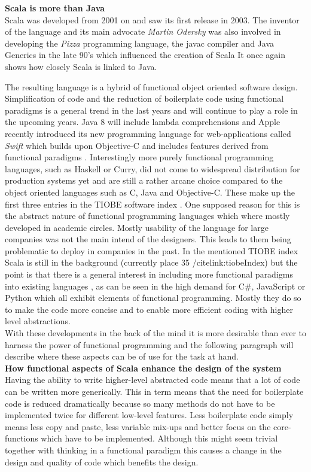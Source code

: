 \documentclass[twoside, 11pt]{scrartcl}
\begin{document}
\textbf{Scala is more than Java}\\
Scala was developed from 2001 on and saw its first release in 2003. The inventor of the language and its main advocate \textit{Martin Odersky} was also involved in developing the \textit{Pizza} programming language, the javac compiler and Java Generics in the late 90's which influenced the creation of Scala \cite{link:scalaHistory} It once again shows how closely Scala is linked to Java.

The resulting language is a hybrid of functional object oriented software design. Simplification of code and the reduction of boilerplate code using functional paradigms is a general trend in the last years and will continue to play a role in the upcoming years. Java 8 will include lambda comprehensions and Apple recently introduced its new programming language for web-applications called \textit{Swift} which builds upon Objective-C and includes features derived from functional paradigms \cite{link:swift}. 
Interestingly more purely functional programming languages, such as Haskell or Curry, did not come to widespread distribution for production systems yet and are still a rather arcane choice compared to the object oriented languages such as C, Java and Objective-C. These make up the first three entries in the TIOBE software index \cite{link:tiobeIndex}. One supposed reason for this is the abstract nature of functional programming languages which where mostly developed in academic circles. Mostly usability of the language for large companies was not the main intend of the designers. This leads to them being problematic to deploy in companies in the past.
In the mentioned TIOBE index Scala is still in the background (currently place 35 /cite{link:tiobeIndex}) but the point is that there is a general interest in including more functional paradigms into existing languages , as can be seen in the high demand for C\#, JavaScript or Python which all exhibit elements of functional programming. Mostly they do so to make the code more concise and to enable more efficient coding with higher level abstractions.\\
With these developments in the back of the mind it is more desirable than ever to harness the power of functional programming and the following paragraph will describe where these aspects can be of use for the task at hand.\\

\textbf{How functional aspects of Scala enhance the design of the system}\\
Having the ability to write higher-level abstracted code means that a lot of code can be written more generically. This in term means that the need for boilerplate code is reduced dramatically because so many methods do not have to be implemented twice for different low-level features. Less boilerplate code simply means less copy and paste, less variable mix-ups and better focus on the core-functions which have to be implemented.
Although this might seem trivial together with thinking in a functional paradigm this causes a change in the design and quality of code which benefits the design. \\
\end{document}
